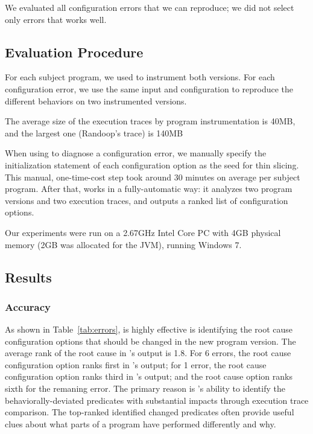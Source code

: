 We evaluated all configuration errors that we can reproduce;
we did not select only errors that \ourtool works well.





\subsection{Evaluation Procedure}

For each subject program, we used \ourtool to instrument both versions. 
For each configuration error, we use the same 
input and configuration
to reproduce the different behaviors on two instrumented versions.

The average size of the execution traces by program instrumentation is 40MB,
and the largest one (Randoop's trace) is 140MB



When using \ourtool to diagnose a configuration error, we manually specify
the initialization statement of each configuration option as
the seed for thin slicing. This manual, one-time-cost step took around
30 minutes on average per subject program. After that,
\ourtool works in a fully-automatic way: it 
analyzes two program versions and two execution traces,
and outputs a ranked list of configuration options.

Our experiments were run on a 2.67GHz Intel Core PC
with 4GB physical memory (2GB was allocated for the JVM),
running Windows 7.

\subsection{Results}

\subsubsection{Accuracy}
\label{sec:accuracy}

As shown in Table~\ref{tab:errors}, \ourtool is highly effective
is identifying the root cause configuration options that should
be changed in the new program version. The average rank of
the root cause in \ourtool's output is 1.8. For 6 errors, the root
cause configuration option ranks first in \ourtool's output;
for 1 error, the root cause configuration option ranks third
in \ourtool's output; and the root cause option ranks sixth
for the remaning error. The primary reason is \ourtool's
ability to identify the behaviorally-deviated predicates with
substantial impacts through execution trace comparison.
The top-ranked identified changed predicates often provide
useful clues about what parts of a program have performed
differently and why.

